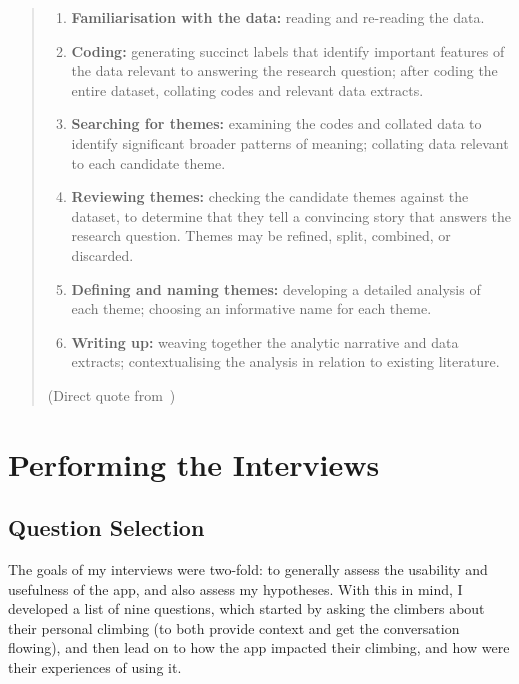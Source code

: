 \begin{quote}
\begin{enumerate}
    \item \textbf{Familiarisation with the data:} reading and re-reading the data.
    \item \textbf{Coding:} generating succinct labels that identify important features of the data relevant to answering the research question; after coding the entire dataset, collating codes and relevant data extracts.
    \item \textbf{Searching for themes:} examining the codes and collated data to identify significant broader patterns of meaning; collating data relevant to each candidate theme.
    \item \textbf{Reviewing themes:} checking the candidate themes against the dataset, to determine that they tell a convincing story that answers the research question. Themes may be refined, split, combined, or discarded.
    \item \textbf{Defining and naming themes:} developing a detailed analysis of each theme; choosing an informative name for each theme.
    \item \textbf{Writing up:} weaving together the analytic narrative and data extracts; contextualising the analysis in relation to existing literature.
\end{enumerate}

\hspace*{\fill}(Direct quote from~\cite{brauminterviewta})
\end{quote}

\section{Performing the Interviews}
\subsection{Question Selection}
The goals of my interviews were two-fold: to generally assess the usability and usefulness of the app, and also assess my hypotheses.
With this in mind, I developed a list of nine questions, which started by asking the climbers about their personal climbing (to both provide context and get the conversation flowing), and then lead on to how the app impacted their climbing, and how were their experiences of using it.

